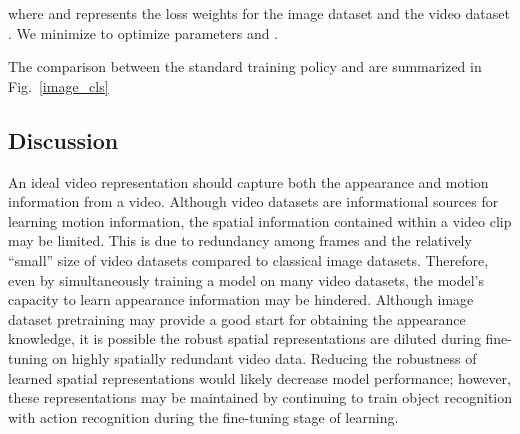 where  and  represents the loss weights for the image dataset  and the video dataset . We minimize   to optimize parameters  and .

The comparison between the standard training policy and \ourmethod are summarized in Fig.~\ref{image_cls}


\subsection{Discussion}
An ideal video representation should capture both the appearance and motion information from a video. Although video datasets are informational sources for learning motion information, the spatial information contained within a video clip may be limited. This is due to redundancy among frames and the relatively ``small'' size of video datasets compared to classical image datasets. Therefore, even by simultaneously training a model on many video datasets, the model's capacity to learn appearance information may be hindered. Although image dataset pretraining may provide a good start for obtaining the appearance knowledge, it is possible the robust spatial representations are diluted during fine-tuning on highly spatially redundant video data. Reducing the robustness of learned spatial representations would likely decrease model performance; however, these representations may be maintained by continuing to train object recognition with action recognition during the fine-tuning stage of learning. 
